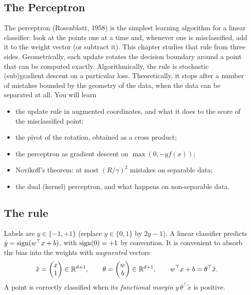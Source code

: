 \begin{notechapter}
\chapter{The Perceptron}\label{ch:perceptron}

\begin{chapterintro}
The perceptron (Rosenblatt, 1958) is the simplest learning algorithm for a linear
classifier: look at the points one at a time and, whenever one is misclassified,
add it to the weight vector (or subtract it). This chapter studies that rule from
three sides. Geometrically, each update rotates the decision boundary around a
point that can be computed exactly. Algorithmically, the rule is stochastic
(sub)gradient descent on a particular loss. Theoretically, it stops after a number
of mistakes bounded by the geometry of the data, when the data can be separated at
all. You will learn
\begin{itemize}[nosep]
  \item the update rule in augmented coordinates, and what it does to the score of
        the misclassified point;
  \item the pivot of the rotation, obtained as a cross product;
  \item the perceptron as gradient descent on $\max(0, -yf(x))$;
  \item Novikoff's theorem: at most $(R/\gamma)^2$ mistakes on separable data;
  \item the dual (kernel) perceptron, and what happens on non-separable data.
\end{itemize}
\end{chapterintro}

\section{The rule}\label{perceptron:sec:rule}

Labels are $y\in\{-1, +1\}$ (replace $y\in\{0,1\}$ by $2y - 1$). A linear classifier predicts
$\hat y = \operatorname{sign}(w^\top x + b)$, with $\operatorname{sign}(0) = +1$ by convention. It is convenient to absorb the
bias into the weights with \emph{augmented} vectors
\[
  \tilde x = \begin{pmatrix}x\\1\end{pmatrix}\in\mathbb{R}^{d+1},\qquad
  \theta = \begin{pmatrix}w\\b\end{pmatrix}\in\mathbb{R}^{d+1},\qquad
  w^\top x + b = \theta^\top\tilde x .
\]
A point is correctly classified when its \emph{functional margin} $y\,\theta^\top\tilde x$ is positive.


\end{notechapter}
